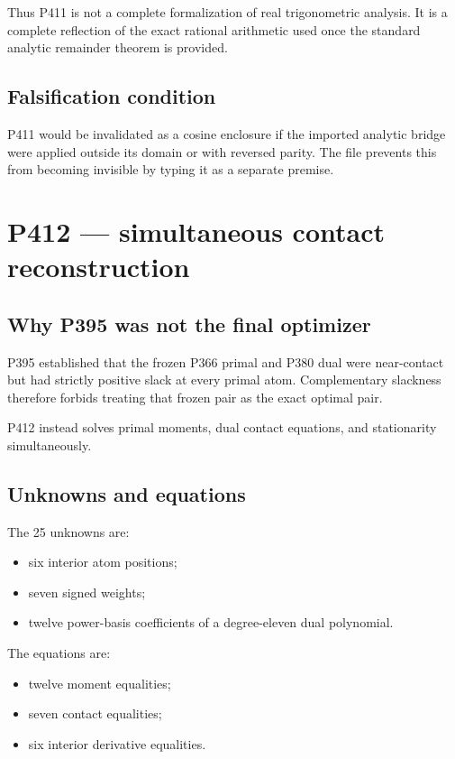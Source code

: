 \documentclass[11pt,a4paper,openany]{report}
\begin{document}
Thus P411 is not a complete formalization of real trigonometric analysis. It is a complete reflection of the exact rational arithmetic used once the standard analytic remainder theorem is provided.

\section{Falsification condition}

P411 would be invalidated as a cosine enclosure if the imported analytic bridge were applied outside its domain or with reversed parity. The file prevents this from becoming invisible by typing it as a separate premise.

\chapter{P412 --- simultaneous contact reconstruction}

\section{Why P395 was not the final optimizer}

P395 established that the frozen P366 primal and P380 dual were near-contact but had strictly positive slack at every primal atom. Complementary slackness therefore forbids treating that frozen pair as the exact optimal pair.

P412 instead solves primal moments, dual contact equations, and stationarity simultaneously.

\section{Unknowns and equations}

The 25 unknowns are:

\begin{itemize}
\item 
six interior atom positions;

\item 
seven signed weights;

\item 
twelve power-basis coefficients of a degree-eleven dual polynomial.

\end{itemize}

The equations are:

\begin{itemize}
\item 
twelve moment equalities;

\item 
seven contact equalities;

\item 
six interior derivative equalities.

\end{itemize}
\end{document}
